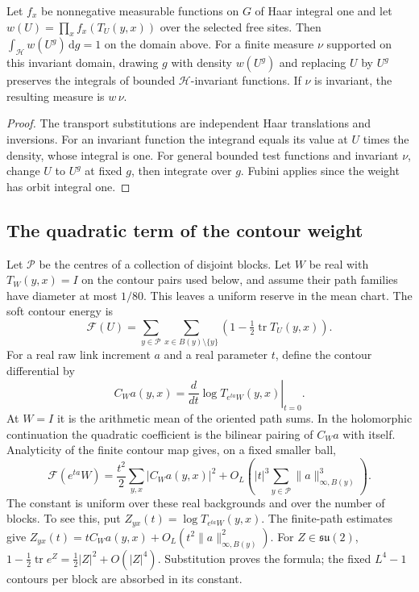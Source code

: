 \documentclass[11pt,letterpaper,reqno]{amsart}
\makeatletter
\numberwithin{equation}{section}
\theoremstyle{definition}
\newcommand{\ms@minorstart}{%
  \pushQED{\qed}\renewcommand{\qedsymbol}{$\blacksquare$}}
\newenvironment{proposition}[1][]{\ms@minorstart\ms@proposition[#1]}
  {\popQED\endms@proposition}
\theoremstyle{remark}
\makeatother
\begin{document}
\begin{proposition}[Insertion of normalized weights]\label{prop:soft-gauge}
Let \(f_x\) be nonnegative measurable functions on \(G\) of Haar
integral one and let
\(w(U)=\prod_x f_x(T_U(y,x))\) over the selected free sites.
Then \(\int_{\mathcal H}w(U^g)\,\mathrm dg=1\) on the domain above.
For a finite measure \(\nu\) supported on this invariant domain,
drawing \(g\) with density \(w(U^g)\)
and replacing \(U\) by \(U^g\) preserves the integrals of bounded
\(\mathcal H\)-invariant functions. If \(\nu\) is invariant, the
resulting measure is \(w\,\nu\).
\end{proposition}

\begin{proof}
The transport substitutions are independent Haar translations and
inversions. For an invariant function the integrand equals its value
at \(U\) times the density, whose integral is one. For general
bounded test functions and invariant \(\nu\), change \(U\) to \(U^g\)
at fixed \(g\), then integrate over \(g\). Fubini applies since the
weight has orbit integral one.
\end{proof}

\subsection{The quadratic term of the contour weight}

Let $\mathcal P$ be the centres of a collection of disjoint blocks.
Let $W$ be real with $T_W(y,x)=I$ on the contour pairs used below,
and assume their path families have diameter at most $1/80$.
This leaves a uniform reserve in the mean chart. The soft contour
energy is
\[
 \mathcal F(U)=\sum_{y\in\mathcal P}
       \sum_{x\in B(y)\setminus\{y\}}
              \left(1-\tfrac12\operatorname{tr}T_U(y,x)\right).
\]
For a real raw link increment \(a\) and a real parameter \(t\),
define the contour differential by
\[
 C_Wa(y,x)=
  \left.\frac{d}{dt}\log T_{e^{ta}W}(y,x)\right|_{t=0}.
\]
At \(W=I\) it is the arithmetic mean of the oriented path sums.
In the holomorphic continuation the quadratic coefficient is
the bilinear pairing of \(C_Wa\) with itself.
Analyticity of the finite contour map gives, on a fixed smaller ball,
\begin{equation}\label{eq:soft-quadratic}
 \mathcal F(e^{ta}W)=\frac{t^2}{2}
          \sum_{y,x}|C_Wa(y,x)|^2
       +O_L\!\left(|t|^3\sum_{y\in\mathcal P}
                                      \|a\|_{\infty,B(y)}^3\right).
\end{equation}
The constant is uniform over these real backgrounds and over the
number of blocks. To see this, put
$Z_{yx}(t)=\log T_{e^{ta}W}(y,x)$. The finite-path estimates give
$Z_{yx}(t)=tC_Wa(y,x)+O_L(t^2\|a\|_{\infty,B(y)}^2)$.
For $Z\in\mathfrak{su}(2)$,
$1-\tfrac12\operatorname{tr}e^Z=\tfrac12|Z|^2+O(|Z|^4)$.
Substitution proves the formula; the fixed $L^4-1$ contours per block
are absorbed in its constant.
\end{document}

